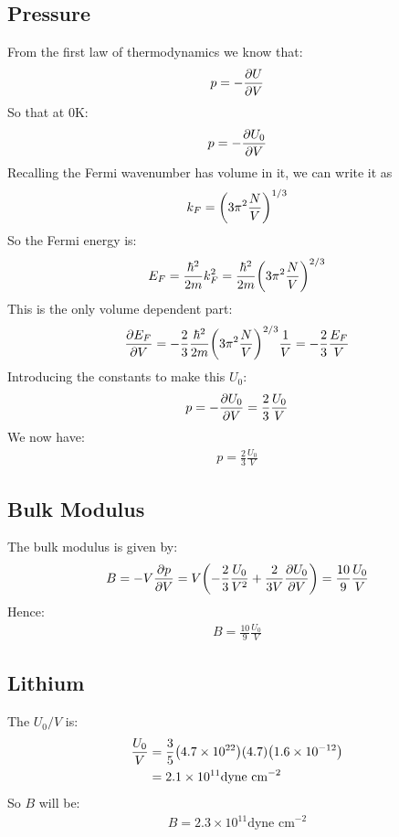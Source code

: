 \documentclass[12pt]{article}
\begin{document}
\subsection*{Pressure}
From the first law of thermodynamics we know that:
\begin{align*}
  p=-\pdv{U}{V}
\end{align*}
So that at $0$K:
\begin{align*}
  p=-\pdv{U_0}{V}
\end{align*}
Recalling the Fermi wavenumber has volume in it, we can write it as
\begin{align*}
  k_F=\qty(3\pi^2\frac{N}{V})^{1/3}
\end{align*}
So the Fermi energy is:
\begin{align*}
  E_F=\frac{\hbar^2}{2m}k_F^2=\frac{\hbar^2}{2m}\qty(3\pi^2\frac{N}{V})^{2/3}
\end{align*}
This is the only volume dependent part:
\begin{align*}
  \pdv{E_F}{V}=-\frac{2}{3}\frac{\hbar^2}{2m}\qty(3\pi^2\frac{N}{V})^{2/3}
  \frac{1}{V}=-\frac{2}{3}\frac{E_F}{V}
\end{align*}
Introducing the constants to make this $U_0$:
\begin{align*}
  p=-\pdv{U_0}{V}=\frac{2}{3}\frac{U_0}{V}
\end{align*}
We now have:
\begin{align*}
  \boxed{p=\frac{2}{3}\frac{U_0}{V}}
\end{align*}
\subsection*{Bulk Modulus}
The bulk modulus is given by:
\begin{align*}
  B=-V\pdv{p}{V}=V\qty(-\frac{2}{3}\frac{U_0}{V^2}+\frac{2}{3V}\pdv{U_0}{V})=
  \frac{10}{9}\frac{U_0}{V}
\end{align*}
Hence:
\begin{align*}
  \boxed{B=\frac{10}{9}\frac{U_0}{V}}
\end{align*}
\subsection*{Lithium}
The $U_0/V$ is:
\begin{align*}
  \frac{U_0}{V}&=\frac{3}{5}\qty(4.7\times10^{22})(4.7)\qty(1.6\times10^{-12})\\
  &=2.1\times10^{11}\text{dyne cm}^{-2}
\end{align*}
So $B$ will be:
\begin{align*}
  B = 2.3\times10^{11}\text{dyne cm}^{-2}
\end{align*}
\end{document}
